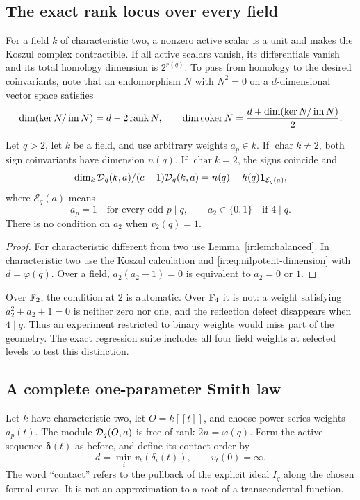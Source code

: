 \subsection{The exact rank locus over every field}
For a field $k$ of characteristic two, a nonzero active scalar is a
unit and makes the Koszul complex contractible. If all active scalars
vanish, its differentials vanish and its total homology dimension is
$2^{r(q)}$. To pass from homology to the desired coinvariants, note
that an endomorphism $N$ with $N^2=0$ on a $d$-dimensional vector
space satisfies
\begin{equation}\label{ir:eq:nilpotent-dimension}
 \dim(\ker N/\operatorname{im} N)=d-2\operatorname{rank} N,
 \qquad
 \dim\operatorname{coker} N=\frac{d+\dim(\ker N/\operatorname{im} N)}2.
\end{equation}

\begin{theorem}
\label{ir:thm:field-locus}
Let $q>2$, let $k$ be a field, and use arbitrary weights $a_p\in k$.
If $\operatorname{char}k\ne2$, both sign coinvariants have dimension
$n(q)$. If $\operatorname{char}k=2$, the signs coincide and
\begin{equation}\label{ir:eq:field-locus}
 \dim_k\mathcal D_q(k,a)/(c-1)\mathcal D_q(k,a)
 =n(q)+h(q)\mathbf 1_{\mathcal E_q(a)},
\end{equation}
where $\mathcal E_q(a)$ means
\[
 a_p=1\quad\text{for every odd }p\mid q,
 \qquad a_2\in\{0,1\}\quad\text{if }4\mid q.
\]
There is no condition on $a_2$ when $v_2(q)=1$.
\end{theorem}
\begin{proof}
For characteristic different from two use
Lemma~\ref{ir:lem:balanced}. In characteristic two use the Koszul
calculation and \eqref{ir:eq:nilpotent-dimension} with
$d=\varphi(q)$. Over a field, $a_2(a_2-1)=0$ is equivalent to
$a_2=0$ or $1$.
\end{proof}

Over $\mathbb F_2$, the condition at $2$ is automatic. Over $\mathbb F_4$ it is
not: a weight satisfying $a_2^2+a_2+1=0$ is neither zero nor one,
and the reflection defect disappears when $4\mid q$. Thus an
experiment restricted to binary weights would miss part of the
geometry. The exact regression suite includes all four field
weights at selected levels to test this distinction.

\subsection{A complete one-parameter Smith law}
Let $k$ have characteristic two, let $O=k[[t]]$, and choose power
series weights $a_p(t)$. The module $\mathcal D_q(O,a)$ is free of rank
$2n=\varphi(q)$. Form the active sequence $\boldsymbol\delta(t)$
as before, and define its contact order by
\begin{equation}\label{ir:eq:contact-order}
 d=\min_i v_t(\delta_i(t)),\qquad v_t(0)=\infty.
\end{equation}
The word ``contact'' refers to the pullback of the explicit ideal
$I_q$ along the chosen formal curve. It is not an approximation to a
root of a transcendental function.

